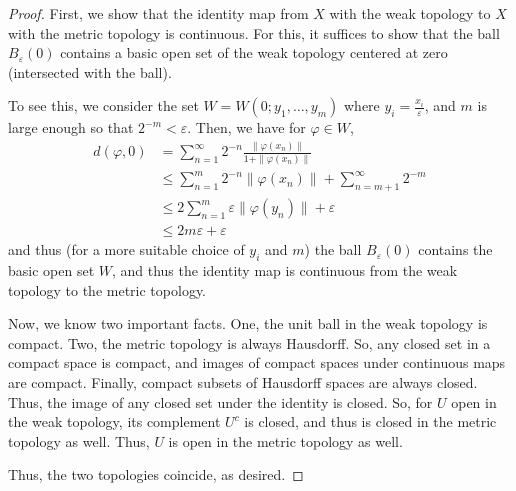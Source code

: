 \documentclass[fontsize=11pt]{scrartcl} %
\numberwithin{equation}{section} %
\numberwithin{figure}{section} %
\numberwithin{table}{section} %
\begin{document}
\begin{proof}
    First, we show that the identity map from $X$ with the weak topology to $X$
    with the metric topology is continuous. For this, it suffices to show that
    the ball $B_{\varepsilon}(0)$ contains a basic open set of the weak topology
    centered at zero (intersected with the ball).

    To see this, we consider the set $W = W(0;y_1,\dots,y_m)$ where $y_i =
    \frac{x_i}{\varepsilon}$, and $m$ is large enough so that
    $2^{-m}<\varepsilon$. Then, we have for $\varphi\in W$,
    \[
\begin{aligned}
    d(\varphi,0) &=
\sum_{n=1}^{\infty}2^{-n}\frac{\|\varphi(x_n)\|}{1+\|\varphi(x_n)\|}\\
&\leq \sum_{n=1}^m 2^{-n}\|\varphi(x_n)\| + \sum_{n=m+1}^{\infty}2^{-m}\\
&\leq 2\sum_{n=1}^m \varepsilon\|\varphi(y_n)\| + \varepsilon\\
&\leq 2m\varepsilon + \varepsilon
\end{aligned}
    \]
    and thus (for a more suitable choice of $y_i$ and $m$) the ball
    $B_{\varepsilon}(0)$ contains the basic open set $W$, and thus the identity
    map is continuous from the weak topology to the metric topology.

    Now, we know two important facts. One, the unit ball in the weak topology is
    compact. Two, the metric topology is always Hausdorff. So, any closed set in
    a compact space is compact, and images of compact spaces under continuous
    maps are compact. Finally, compact subsets of Hausdorff spaces are always
    closed. Thus, the image of any closed set under the identity is closed.
    So, for $U$ open in the weak topology, its complement $U^c$ is closed, and
    thus is closed in the metric topology as well. Thus, $U$ is open in the
    metric topology as well.

    Thus, the two topologies coincide, as desired.
\end{proof}
\end{document}
